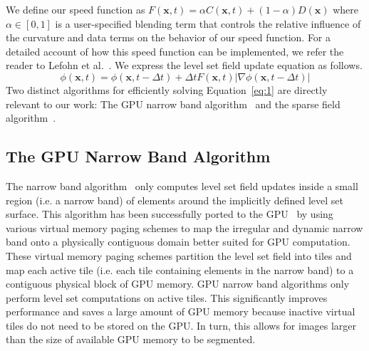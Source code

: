 \documentclass{egpubl}
\newcommand{\leftbracket}{\left(}
\newcommand{\rightbracket}{\right)}
\newcommand{\leftvbracket}{\left|}
\newcommand{\rightvbracket}{\right|}
\newcommand{\leftsbracket}{\left[}
\newcommand{\rightsbracket}{\right]}
\newcommand{\boldx}{{\mathbf x}}
\newcommand{\phixt}{ \mathit{\phi} \leftbracket \boldx , t \rightbracket }
\newcommand{\phixtmdt}{ \mathit{\phi} \leftbracket \boldx , t - \Delta t \rightbracket }
\begin{document}
We define our speed function as $ F \leftbracket \boldx , t \rightbracket = \alpha C \leftbracket \boldx , t \rightbracket + \leftbracket 1 - \alpha \rightbracket D \leftbracket \boldx \rightbracket $ where $\alpha \in \leftsbracket 0 , 1 \rightsbracket $ is a user-specified blending term that controls the relative influence of the curvature and data terms on the behavior of our speed function. For a detailed account of how this speed function can be implemented, we refer the reader to Lefohn et al.~\cite{Lefohn-2004}. We express the level set field update equation as follows.
\begin{equation}
    \phixt = \phixtmdt + \Delta t F \leftbracket \boldx , t \rightbracket \leftvbracket \nabla \phixtmdt \rightvbracket
\label{eq:1}
\end{equation}
Two distinct algorithms for efficiently solving Equation~\ref{eq:1} are directly relevant to our work: The GPU narrow band algorithm~\cite{Lefohn-2003-MICCAI,Lefohn-2003-Vis,Cates-2004,Lefohn-2004,Jeong-2009} and the sparse field algorithm~\cite{Whitaker-1998,Peng-1999}.


\subsection{The GPU Narrow Band Algorithm}

The narrow band algorithm~\cite{Adalsteinsson-1995} only computes level set field updates inside a small region (i.e. a narrow band) of elements around the implicitly defined level set surface. This algorithm has been successfully ported to the GPU~\cite{Lefohn-2003-MICCAI,Lefohn-2003-Vis,Cates-2004,Lefohn-2004,Jeong-2009} by using various virtual memory paging schemes to map the irregular and dynamic narrow band onto a physically contiguous domain better suited for GPU computation. These virtual memory paging schemes partition the level set field into tiles and map each active tile (i.e. each tile containing elements in the narrow band) to a contiguous physical block of GPU memory. GPU narrow band algorithms only perform level set computations on active tiles. This significantly improves performance and saves a large amount of GPU memory because inactive virtual tiles do not need to be stored on the GPU. In turn, this allows for images larger than the size of available GPU memory to be segmented.
\end{document}
